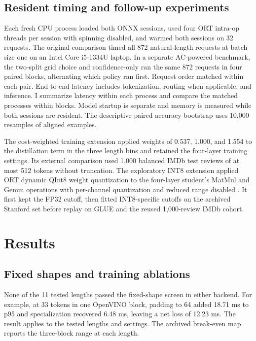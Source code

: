 \documentclass{article}
\begin{document}
\subsection{Resident timing and follow-up experiments}
Each fresh CPU process loaded both ONNX sessions, used four ORT intra-op threads per session with spinning disabled, and warmed both sessions on 32 requests. The original comparison timed all 872 natural-length requests at batch size one on an Intel Core i5-1334U laptop. In a separate AC-powered benchmark, the two-split grid choice and confidence-only ran the same 872 requests in four paired blocks, alternating which policy ran first. Request order matched within each pair. End-to-end latency includes tokenization, routing when applicable, and inference. I summarize latency within each process and compare the matched processes within blocks. Model startup is separate and memory is measured while both sessions are resident. The descriptive paired accuracy bootstrap uses 10,000 resamples of aligned examples.

The cost-weighted training extension applied weights of 0.537, 1.000, and 1.554 to the distillation term in the three length bins and retained the four-layer training settings. Its external comparison used 1,000 balanced IMDb test reviews of at most 512 tokens without truncation. The exploratory INT8 extension applied ORT dynamic QInt8 weight quantization to the four-layer student's MatMul and Gemm operations with per-channel quantization and reduced range disabled \citep{ortquant}. It first kept the FP32 cutoff, then fitted INT8-specific cutoffs on the archived Stanford set before replay on GLUE and the reused 1,000-review IMDb cohort.

\section{Results}
\subsection{Fixed shapes and training ablations}
None of the 11 tested lengths passed the fixed-shape screen in either backend. For example, at 33 tokens in one OpenVINO block, padding to 64 added 18.71 ms to p95 and specialization recovered 6.48 ms, leaving a net loss of 12.23 ms. The result applies to the tested lengths and settings. The archived break-even map reports the three-block range at each length.
\end{document}
